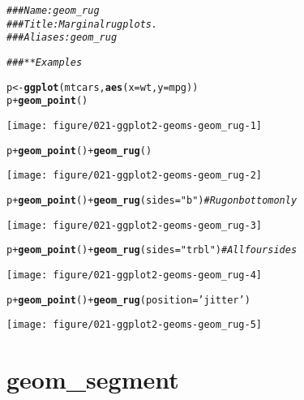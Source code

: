 \documentclass[a4paper,titlepage]{tufte-handout}\usepackage[]{graphicx}\usepackage[]{color}
\makeatletter
\def\maxwidth{ %
  \ifdim\Gin@nat@width>\linewidth
    \linewidth
  \else
    \Gin@nat@width
  \fi
}
\newcommand{\hlstr}[1]{\textcolor[rgb]{0.192,0.494,0.8}{#1}}%
\newcommand{\hlcom}[1]{\textcolor[rgb]{0.678,0.584,0.686}{\textit{#1}}}%
\newcommand{\hlopt}[1]{\textcolor[rgb]{0,0,0}{#1}}%
\newcommand{\hlstd}[1]{\textcolor[rgb]{0.345,0.345,0.345}{#1}}%
\newcommand{\hlkwb}[1]{\textcolor[rgb]{0.69,0.353,0.396}{#1}}%
\newcommand{\hlkwc}[1]{\textcolor[rgb]{0.333,0.667,0.333}{#1}}%
\newcommand{\hlkwd}[1]{\textcolor[rgb]{0.737,0.353,0.396}{\textbf{#1}}}%
\newenvironment{kframe}{%
 \def\at@end@of@kframe{}%
 \ifinner\ifhmode%
  \def\at@end@of@kframe{\end{minipage}}%
  \begin{minipage}{\columnwidth}%
 \fi\fi%
 \def\FrameCommand##1{\hskip\@totalleftmargin \hskip-\fboxsep
 \colorbox{shadecolor}{##1}\hskip-\fboxsep
     \hskip-\linewidth \hskip-\@totalleftmargin \hskip\columnwidth}%
 \MakeFramed {\advance\hsize-\width
   \@totalleftmargin\z@ \linewidth\hsize
   \@setminipage}}%
 {\par\unskip\endMakeFramed%
 \at@end@of@kframe}
\newenvironment{knitrout}{}{} %
\makeatother
\begin{document}
\begin{knitrout}
\color{fgcolor}\begin{kframe}
\begin{alltt}
\hlcom{### Name: geom_rug}
\hlcom{### Title: Marginal rug plots.}
\hlcom{### Aliases: geom_rug}

\hlcom{### ** Examples}

\hlstd{p} \hlkwb{<-} \hlkwd{ggplot}\hlstd{(mtcars,} \hlkwd{aes}\hlstd{(}\hlkwc{x}\hlstd{=wt,} \hlkwc{y}\hlstd{=mpg))}
\hlstd{p} \hlopt{+} \hlkwd{geom_point}\hlstd{()}
\end{alltt}
\end{kframe}
\texttt{[image: figure/021-ggplot2-geoms-geom\_rug-1]} 
\begin{kframe}\begin{alltt}
\hlstd{p} \hlopt{+} \hlkwd{geom_point}\hlstd{()} \hlopt{+} \hlkwd{geom_rug}\hlstd{()}
\end{alltt}
\end{kframe}
\texttt{[image: figure/021-ggplot2-geoms-geom\_rug-2]} 
\begin{kframe}\begin{alltt}
\hlstd{p} \hlopt{+} \hlkwd{geom_point}\hlstd{()} \hlopt{+} \hlkwd{geom_rug}\hlstd{(}\hlkwc{sides}\hlstd{=}\hlstr{"b"}\hlstd{)}    \hlcom{# Rug on bottom only}
\end{alltt}
\end{kframe}
\texttt{[image: figure/021-ggplot2-geoms-geom\_rug-3]} 
\begin{kframe}\begin{alltt}
\hlstd{p} \hlopt{+} \hlkwd{geom_point}\hlstd{()} \hlopt{+} \hlkwd{geom_rug}\hlstd{(}\hlkwc{sides}\hlstd{=}\hlstr{"trbl"}\hlstd{)} \hlcom{# All four sides}
\end{alltt}
\end{kframe}
\texttt{[image: figure/021-ggplot2-geoms-geom\_rug-4]} 
\begin{kframe}\begin{alltt}
\hlstd{p} \hlopt{+} \hlkwd{geom_point}\hlstd{()} \hlopt{+} \hlkwd{geom_rug}\hlstd{(}\hlkwc{position}\hlstd{=}\hlstr{'jitter'}\hlstd{)}
\end{alltt}
\end{kframe}
\texttt{[image: figure/021-ggplot2-geoms-geom\_rug-5]} 

\end{knitrout}


\section{geom\_segment}
\end{document}
